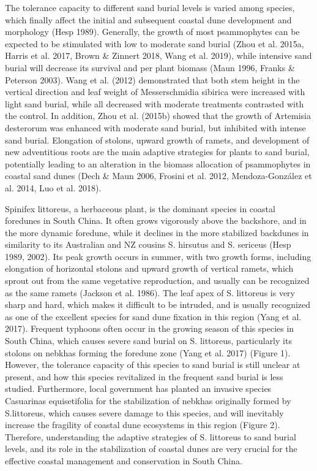 \documentclass[]{interact}
\theoremstyle{plain}%
\theoremstyle{definition}
\theoremstyle{remark}
\begin{document}
\label{Introduction-3}
The tolerance capacity to different sand burial levels is varied among species, which finally affect the initial and subsequent coastal dune development and morphology (Hesp 1989). Generally, the growth of most psammophytes can be expected to be stimulated with low to moderate sand burial (Zhou et al. 2015a, Harris et al. 2017, Brown \& Zinnert 2018, Wang et al. 2019), while intensive sand burial will decrease its survival and per plant biomass (Maun 1996, Franks \& Peterson 2003). Wang et al. (2012) demonstrated that both stem height in the vertical direction and leaf weight of Messerschmidia sibirica were increased with light sand burial, while all decreased with moderate treatments contrasted with the control. In addition, Zhou et al. (2015b) showed that the growth of Artemisia desterorum was enhanced with moderate sand burial, but inhibited with intense sand burial. Elongation of stolons, upward growth of ramets, and development of new adventitious roots are the main adaptive strategies for plants to sand burial, potentially leading to an alteration in the biomass allocation of psammophytes in coastal sand dunes (Dech \& Maun 2006, Frosini et al. 2012, Mendoza-González et al. 2014, Luo et al. 2018). 

\label{Introduction-4}
Spinifex littoreus, a herbaceous plant, is the dominant species in coastal foredunes in South China. It often grows vigorously above the backshore, and in the more dynamic foredune, while it declines in the more stabilized backdunes in similarity to its Australian and NZ cousins S. hirsutus and S. sericeus (Hesp 1989, 2002). Its peak growth occurs in summer, with two growth forms, including elongation of horizontal stolons and upward growth of vertical ramets, which sprout out from the same vegetative reproduction, and usually can be recognized as the same ramets (Jackson et al. 1986). The leaf apex of S. littoreus is very sharp and hard, which makes it difficult to be intruded, and is usually recognized as one of the excellent species for sand dune fixation in this region (Yang et al. 2017). Frequent typhoons often occur in the growing season of this species in South China, which causes severe sand burial on S. littoreus, particularly its stolons on nebkhas forming the foredune zone (Yang et al. 2017) (Figure 1). However, the tolerance capacity of this species to sand burial is still unclear at present, and how this species revitalized in the frequent sand burial is less studied. Furthermore, local government has planted an invasive species Casuarinas equisetifolia for the stabilization of nebkhas originally formed by S.littoreus, which causes severe damage to this species, and will inevitably increase the fragility of coastal dune ecosystems in this region (Figure 2). Therefore, understanding the adaptive strategies of S. littoreus to sand burial levels, and its role in the stabilization of coastal dunes are very crucial for the effective coastal management and conservation in South China. 
\end{document}

